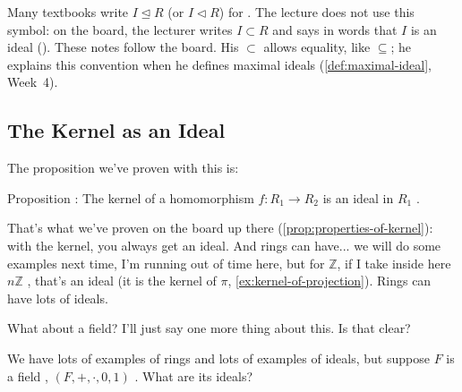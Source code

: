 \begin{aiNote}
Many textbooks write $I \trianglelefteq R$ (or $I \lhd R$) for . The lecture does not use this symbol: on the board, the lecturer writes $I \subset R$ and says in words that $I$ is an ideal (). These notes follow the board. His $\subset$ allows equality, like $\subseteq$; he explains this convention when he defines maximal ideals (\cref{def:maximal-ideal}, Week~4).
\end{aiNote}

\subsection{The Kernel as an Ideal}

\begin{speech}[00:38:07 - 00:39:13]
The proposition we've proven with this is:

Proposition : The kernel of a homomorphism $f \colon R_1 \to R_2$  is an ideal  in $R_1$ .

That's what we've proven on the board up there (\cref{prop:properties-of-kernel}): with the kernel, you always get an ideal. And rings can have... we will do some examples next time, I'm running out of time here, but for $\mathbb{Z}$, if I take inside here $n\mathbb{Z}$ , that's an ideal (it is the kernel of $\pi$, \cref{ex:kernel-of-projection}). Rings can have lots of ideals.

What about a field? I'll just say one more thing about this. Is that clear?

We have lots of examples of rings and lots of examples of ideals, but suppose $F$ is a field , $(F, +, \cdot, 0, 1)$ . What are its ideals? 
\end{speech}

